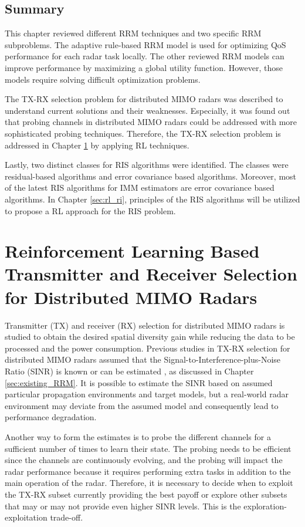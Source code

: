 \documentclass[english, 12pt, a4paper, elec, utf8, a-1b, online]{aaltothesis}
\begin{document}
\subsection{Summary}

This chapter reviewed different RRM techniques and two specific RRM subproblems.
The adaptive rule-based RRM model is used for optimizing QoS performance for each radar task locally.
The other reviewed RRM models can improve performance by maximizing a global utility function.
However, those models require solving difficult optimization problems.

The TX-RX selection problem for distributed MIMO radars was described to understand current solutions and their weaknesses.
Especially, it was found out that probing channels in distributed MIMO radars could be addressed with more sophisticated probing techniques.
Therefore, the TX-RX selection problem is addressed in Chapter \ref{sec:RL_TX_RX} by applying RL techniques.

Lastly, two distinct classes for RIS algorithms were identified. 
The classes were residual-based algorithms and error covariance based algorithms.
Moreover, most of the latest RIS algorithms for IMM estimators are error covariance based algorithms.
In Chapter \ref{sec:rl_ri}, principles of the RIS algorithms will be utilized to propose a RL approach for the RIS problem.


\newpage
\section{Reinforcement Learning Based Transmitter and Receiver Selection for Distributed MIMO Radars}\label{sec:RL_TX_RX}

Transmitter (TX) and receiver (RX) selection for distributed MIMO radars is studied to obtain the desired spatial diversity gain while reducing the data to be processed and the power consumption.
Previous studies in TX-RX selection for distributed MIMO radars assumed that the Signal-to-Interference-plus-Noise Ratio (SINR) is known or can be estimated \cite{Godrich2011a, Godrich2011, Sun2014}, as discussed in Chapter \ref{sec:existing_RRM}.
It is possible to estimate the SINR based on assumed particular propagation environments and target models, but a real-world radar environment may deviate from the assumed model and consequently lead to performance degradation.

Another way to form the estimates is to probe the different channels for a sufficient number of times to learn their state.
The probing needs to be efficient since the channels are continuously evolving, and the probing will impact the radar performance because it requires performing extra tasks in addition to the main operation of the radar.  Therefore, it is necessary to decide when to exploit the TX-RX subset currently providing the best payoff or explore other subsets that may or may not provide even higher SINR levels. 
This is the exploration-exploitation trade-off.
\end{document}
